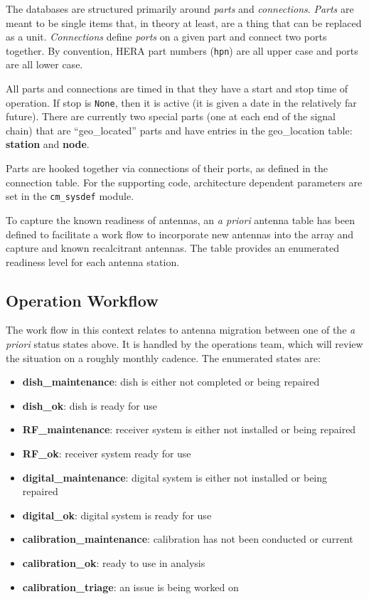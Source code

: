 \documentclass{article}
\begin{document}
The databases are structured primarily around {\em parts} and {\em connections}.  {\em Parts} are meant to be single items that, in theory at least, are a thing that can be replaced as a unit.
{\em Connections} define {\em ports} on a given part and connect two ports together.  By convention, HERA part numbers ({\tt hpn}) are all upper case and ports are all lower case.

All parts and connections are timed in that they have a start and stop time of operation.  If stop is {\tt None}, then it is active (it is given a date in the relatively far future).  There are currently two special parts (one at each end of the signal chain) that are ``geo\_located'' parts and have entries in the geo\_location table: {\bf station} and {\bf node}.

Parts are hooked together via connections of their ports, as defined in the connection table.   For the supporting code, architecture dependent parameters are set in the {\tt cm\_sysdef} module.

To capture the known readiness of antennas, an {\em a priori} antenna table has been defined to facilitate a work flow to incorporate new antennas into the array and capture and known recalcitrant antennas.  The table provides an enumerated readiness level for each antenna station.


\subsection{Operation Workflow}
The work flow in this context relates to antenna migration between one of the {\em a priori} status states above.  It is handled by the operations team, which will review the situation on a roughly monthly cadence.
The enumerated states are:
\begin{itemize}\setlength\itemsep{-.3em}
            \item {\bf dish\_maintenance}: dish is either not completed or being repaired
            \item {\bf dish\_ok}: dish is ready for use
            \item {\bf RF\_maintenance}:  receiver system is either not installed or being repaired
            \item {\bf RF\_ok}:  receiver system ready for use
            \item {\bf digital\_maintenance}:  digital system is either not installed or being repaired
            \item {\bf digital\_ok}: digital system is ready for use
            \item {\bf calibration\_maintenance}:  calibration has not been conducted or current
            \item {\bf calibration\_ok}:  ready to use in analysis
            \item {\bf calibration\_triage}:  an issue is being worked on
\end{itemize}
\end{document}
